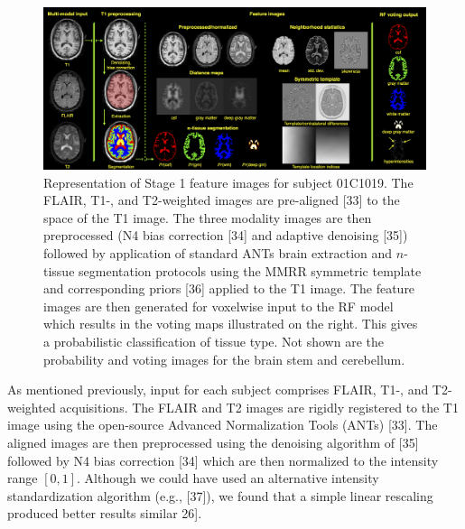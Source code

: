 \documentclass[11pt,]{article}
\begin{document}
\begin{figure}[htbp]
\centering
\includegraphics{Figures/featureImages.png}
\caption{Representation of Stage 1 feature images for subject 01C1019.
The FLAIR, T1-, and T2-weighted images are
 pre-aligned {[}33{]} to the space
of the T1 image. The three modality images are then preprocessed (N4
bias correction {[}34{]} and adaptive denoising {[}35{]}) followed by
application of standard ANTs brain extraction and \(n\)-tissue
segmentation protocols using the MMRR symmetric template and
corresponding priors {[}36{]} applied to the T1 image. The feature
images are then generated for voxelwise input to the RF model which
results in the voting maps illustrated on the right. This gives a
probabilistic classification of tissue type. Not shown are the
probability and voting images for the brain stem and cerebellum.}
\end{figure}

As mentioned previously, input for each subject comprises FLAIR, T1-,
and T2-weighted acquisitions. The FLAIR and T2 images are rigidly
registered to the T1 image using the open-source Advanced Normalization
Tools (ANTs) {[}33{]}. The aligned images are then preprocessed using
the denoising algorithm of {[}35{]} followed by N4 bias correction
{[}34{]} which are then normalized to the intensity range \([0,1]\).
Although we could have used an alternative intensity standardization
algorithm (e.g., {[}37{]}), we found that a simple linear rescaling
produced better results similar \added[id=dt]{to previous work}{[}26{]}.
\end{document}
